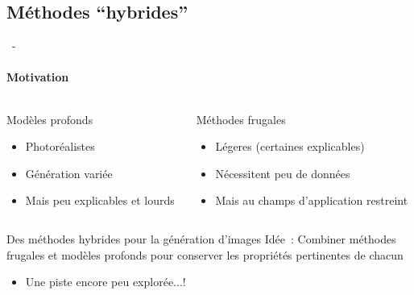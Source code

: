 \documentclass[aspectratio=169, 22pt]{beamer}
\begin{document}
\subsection{Méthodes ``hybrides''}
\begin{frame}{\secname~- \subsecname}
  \framesubtitle{Motivation} 
  \begin{columns}
    \begin{column}{0.5\linewidth}
      \begin{block}{Modèles profonds}
        \begin{itemize}
        \item \small Photoréalistes
        \item \small Génération variée
        \item \small Mais peu explicables et lourds
        \end{itemize}
      \end{block}      
    \end{column}

    \pause
    \begin{column}{0.5\linewidth}
      \begin{customblock}{Méthodes frugales}
        \begin{itemize}
        \item \small Légeres (certaines explicables)
        \item \small Nécessitent peu de données
        \item \small Mais au champs d'application restreint
        \end{itemize}
      \end{customblock}      
    \end{column}    
  \end{columns}

  \vfill
  \pause
  \begin{exampleblock}{\centering Des méthodes hybrides pour la génération d'images}
    \centering
    \alert{Idée}~: Combiner méthodes frugales et modèles profonds pour
    conserver les propriétés pertinentes de chacun
  \end{exampleblock}
  \begin{itemize}
    \centering
    \item Une piste encore peu explorée...!
  \end{itemize}
\end{frame}
\end{document}
